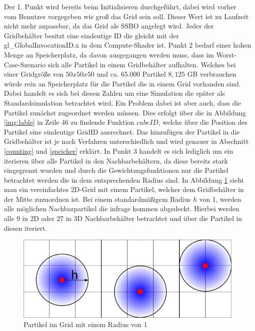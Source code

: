 \documentclass[intern,palatino]{cgBA}
\begin{document}
Der 1. Punkt wird bereits beim Initialisieren durchgeführt, dabei wird vorher vom Benutzer vorgegeben wie groß das Grid sein soll. Dieser Wert ist zu Laufzeit nicht mehr anpassbar, da das Grid als SSBO angelegt wird. Jeder der Gridbehälter besitzt eine eindeutige ID die gleicht mit der gl\_GlobalInvocationID.x in dem Compute-Shader ist. 
\newline
Punkt 2 bedarf einer hohen Menge an Speicherplatz, da davon ausgegangen werden muss, dass im Worst-Case-Szenario sich alle Partikel in einem Gridbehälter aufhalten. Welches bei einer Gridgröße von $50x50x50$ und ca. $65.000$ Partikel $8,125$ GB verbrauchen würde rein an Speicherplatz für die Partikel die in einem Grid vorhanden sind. Dabei handelt es sich bei diesen Zahlen um eine Simulation die später als Standardsimulation betrachtet wird.
\newline
Ein Problem dabei ist aber auch, dass die Partikel zunächst zugeordnet werden müssen. Dies erfolgt über die in Abbildung \ref{img:lable} in Zeile 46 zu findende Funktion $cubeID$, welche über die Position des Partikel eine eindeutige GridID ausrechnet. Das hinzufügen der Partikel in die Gridbehälter ist je nach Verfahren unterschiedlich und wird genauer in Abschnitt \ref{counting} und \ref{speicher}  erklärt.
\newline
In Punkt 3 handelt es sich lediglich um ein iterieren über alle Partikel in den Nachbarbehältern, da diese bereits stark eingegrenzt wurden und durch die Gewichtungsfunktionen nur die Partikel betrachtet werden die in dem entsprechenden Radius sind.
\newline
In Abbildung \ref{img:grid} sieht man ein vereinfachtes 2D-Grid mit einem Partikel, welcher dem Gridbehälter in der Mitte zuzuordnen ist. Bei einem standardmäßigem Radius $h$ von 1, werden alle möglichen Nachbarpartikel die infrage kommen abgedeckt. Hierbei werden alle 9 in 2D oder 27 in 3D Nachbarbehälter betrachtet und über die Partikel in diesen iteriert.

\begin{figure}[H]
	\centering
	\includegraphics[width=1\columnwidth]{Bilder/grid.jpg}
	\caption{Partikel im Grid mit einem Radius von 1}
	\label{img:grid}
\end{figure}
\end{document}
